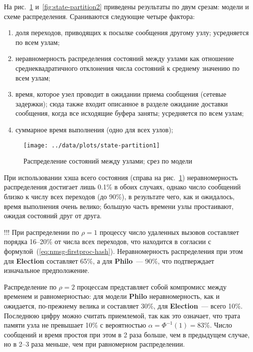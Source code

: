 \documentclass[12pt,a4paper,fleqn]{article}
\newcommand{\Code}[1]{\textbf{\mbox{#1}}}
\begin{document}
На рис.~\ref{fig:state-partition1} и~\ref{fig:state-partition2} приведены результаты по двум срезам:
модели и схеме распределения. Сраниваются следующие четыре фактора:
\begin{enumerate}
\item доля переходов, приводящих к посылке сообщения другому узлу; усредняется по всем узлам;
\item неравномерность распределения состояний между узлами как отношение среднеквадратичного
  отклонения числа состояний к среднему значению по всем узлам;
\item время, которое узел проводит в ожидании приема сообщения (сетевые задержки); сюда также входит
  описанное в разделе ожидание доставки сообщения, когда все исходящие буфера заняты; усредняется по
  всем узлам;
\item суммарное время выполнения (одно для всех узлов);
\end{enumerate}

\begin{figure}[htb]
  \centering
  \texttt{[image: ../data/plots/state-partition1]}
  \caption{Распределение состояний между узлами; срез по модели}
  \label{fig:state-partition1}
\end{figure}

При использовании хэша всего состояния (справа на рис.~\ref{fig:state-partition1}) неравномерность
распределения достигает лишь 0.1\% в обоих случаях, однако число сообщений близко к числу всех
переходов (до 90\%), в результате чего, как и ожидалось, время выполнения очень велико; большую
часть времени узлы простаивают, ожидая состояний друг от друга.

!!!
При распределении по $\rho = 1$ процессу число удаленных вызовов составляет порядка 16--20\% от
числа всех переходов, что находится в согласии с
формулой~(\ref{eq:nmsg-firstproc-hash}). Неравномерность распределения при этом для \Code{Election}
составляет 65\%, а для \Code{Philo}~--- 90\%, что подтверждает изначальное предположение.

Распределение по $\rho = 2$ процессам представляет собой компромисс между временем и равномерностью:
для модели \Code{Philo} неравномерность, как и ожидается, по-прежнему велика и составляет 30\%, для
\Code{Election}~--- всего 10\%. Последнюю цифру можно считать приемлемой, так как это означает, что
трата памяти узла не превышает 10\% с вероятностью $\alpha = \Phi^{-1}(1) = 83\%$. Число сообщений и
время простоя при этом в 2 раза больше, чем в предыдущем случае, но в 2--3 раза меньше, чем при
равномерном распределении.
\end{document}
